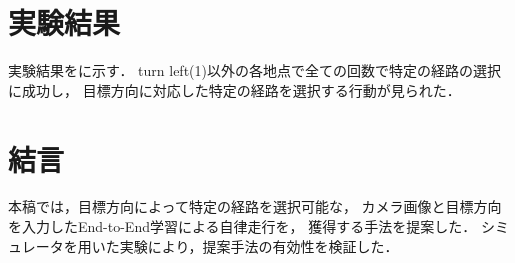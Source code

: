 \documentclass[10pt]{jarticle}
\begin{document}
   \section{実験結果}
   実験結果をに示す．
   turn left(1)以外の各地点で全ての回数で特定の経路の選択に成功し，
   目標方向に対応した特定の経路を選択する行動が見られた．

    \section{結\hspace{2zw}言}%
    本稿では，目標方向によって特定の経路を選択可能な，
    カメラ画像と目標方向を入力したEnd-to-End学習による自律走行を，
    獲得する手法を提案した．
    シミュレータを用いた実験により，提案手法の有効性を検証した．
    
\end{document}
